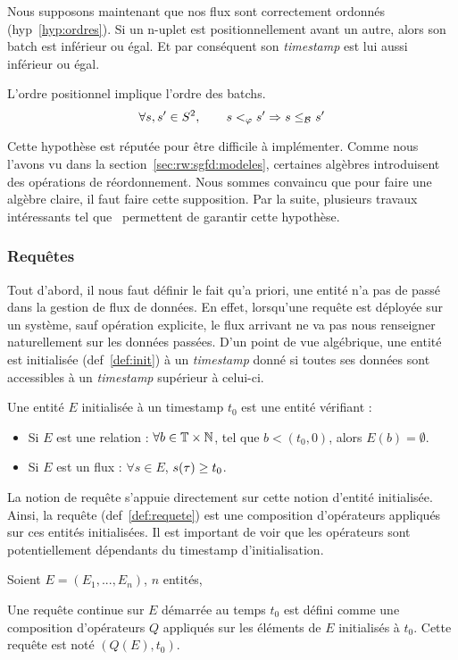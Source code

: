Nous supposons maintenant que nos flux sont correctement ordonnés (hyp~\ref{hyp:ordres}). Si un n-uplet est positionnellement avant un autre, alors son batch est inférieur ou égal. Et par conséquent son \textit{timestamp} est lui aussi inférieur ou égal.
\begin{hyp}\label{hyp:ordres}
L'ordre positionnel implique l'ordre des batchs.
$$\forall s, s'\in S^2, \qquad s <_\varphi s' \Rightarrow s \leq_{\mathcal{B}_{}} s'$$
\end{hyp}
Cette hypothèse est réputée pour être difficile à implémenter. Comme nous l'avons vu dans la section~\ref{sec:rw:sgfd:modeles}, certaines algèbres introduisent des opérations de réordonnement. Nous sommes convaincu que pour faire une algèbre claire, il faut faire cette supposition. Par la suite, plusieurs travaux intéressants tel que~\cite{Krishnamurthy:discontinuous} permettent de garantir cette hypothèse.

\subsubsection{Requêtes}
Tout d'abord, il nous faut définir le fait qu'a priori, une entité n'a pas de passé dans la gestion de flux de données. En effet, lorsqu'une requête est déployée sur un système, sauf opération explicite, le flux arrivant ne va pas nous renseigner naturellement sur les données passées. D'un point de vue algébrique, une entité est initialisée (def~\ref{def:init}) à un \textit{timestamp} donné si toutes ses données sont accessibles à un \textit{timestamp} supérieur à celui-ci.
\begin{defi}\label{def:init}
	Une entité $E$ initialisée à un timestamp $t_0$ est une entité vérifiant :
	\begin{itemize}
		\item Si $E$ est une relation : $\forall b \in \mathbb{T}\times\mathbb{N}$, tel que $b<(t_0,0)$, alors $E(b) = \emptyset$.
		\item Si $E$ est un flux : $\forall s\in E$, $s(\tau) \geq t_0$.
	\end{itemize}
\end{defi}

La notion de requête s'appuie directement sur cette notion d'entité initialisée. Ainsi, la requête (def~\ref{def:requete}) est une composition d'opérateurs appliqués sur ces entités initialisées. Il est important de voir que les opérateurs sont potentiellement dépendants du timestamp d'initialisation.
\begin{defi}[Requête]\label{def:requete}
	Soient $E=(E_1, ..., E_n)$, $n$ entités,
	
	Une requête continue sur $E$ démarrée au temps $t_0$ est défini comme une composition d'opérateurs $Q$ appliqués sur les éléments de $E$ initialisés à $t_0$. Cette requête est noté $(Q(E),t_0)$.
\end{defi}

